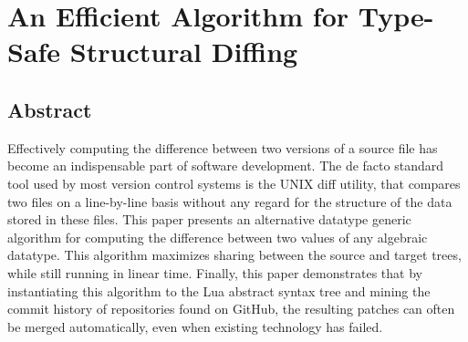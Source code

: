 \chapter{An Efficient Algorithm for Type-Safe Structural Diffing}

\section{Abstract}
Effectively computing the difference between two versions of a source file has become an indispensable part of software development. The de facto standard tool used by most version control systems is the UNIX diff utility, that compares two files on a line-by-line basis without any regard for the structure of the data stored in these files. This paper presents an alternative datatype generic algorithm for computing the difference between two values of any algebraic datatype. This algorithm maximizes sharing between the source and target trees, while still running in linear time. Finally, this paper demonstrates that by instantiating this algorithm to the Lua abstract syntax tree and mining the commit history of repositories found on GitHub, the resulting patches can often be merged automatically, even when existing technology has failed.

